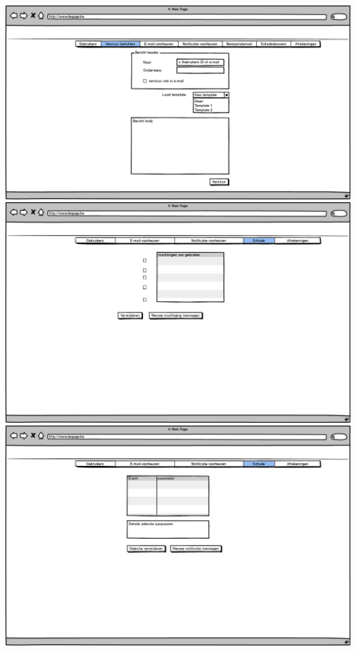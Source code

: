\documentclass[]{article}
\begin{document}
\includegraphics[scale=0.4]{mockups/admin_dashboard_stuur_bericht.png}
\includegraphics[scale=0.4]{mockups/admin_machtigingentoevoegen.png}
\includegraphics[scale=0.4]{mockups/admin_notificatievoorkeuren.png}
\end{document}
